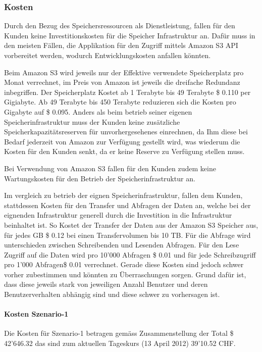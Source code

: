 \subsubsection{Kosten}
Durch den Bezug des Speichersressourcen als Dienstleistung, fallen für den Kunden keine Investitionskosten für die Speicher Infrastruktur an.
Dafür muss in den meisten Fällen, die Applikation für den Zugriff mittels Amazon S3 API vorbereitet werden, wodurch Entwicklungskosten anfallen könnten.

Beim Amazon S3 wird jeweils nur der Effektive verwendete Speicherplatz pro Monat verrechnet, im Preis von Amazon ist jeweils die dreifache Redundanz inbegriffen. Der Speicherplatz Kostet ab 1 Terabyte bis 49 Terabyte \$ 0.110 per Gigiabyte. Ab 49 Terabyte bis 450 Terabyte reduzieren sich die Kosten pro Gigabyte auf \$ 0.095. Anders als beim betrieb seiner eigenen Speicherinfrastruktur muss der Kunden keine zusätzliche Speicherkapazitätsreserven für unvorhergesehenes einrechnen, da Ihm diese bei Bedarf jederzeit von Amazon zur Verfügung gestellt wird, was wiederum die Kosten für den Kunden senkt, da er keine Reserve zu Verfügung stellen muss.

Bei Verwendung von Amazon S3 fallen für den Kunden zudem keine Wartungskosten für den Betrieb der Speicherinfrastruktur an. 

Im vergleich zu betrieb der eignen Speicherinfrastruktur, fallen dem Kunden, stattdessen Kosten für den Transfer und Abfragen der Daten an, welche bei der eignenden Infrastruktur generell durch die Investition in die Infrastruktur beinhaltet ist. So Kostet der Transfer der Daten aus der Amazon S3 Speicher aus, für jedes GB \$ 0.12 bei einen Transfervolumen bis 10 TB. Für die Abfrage wird unterschieden zwischen Schreibenden und Lesenden Abfragen. Für den Lese Zugriff auf die Daten wird pro 10'000 Abfragen \$ 0.01 und für jede Schreibzugriff pro 1'000 Abfragen\$ 0.01 verrechnet. Gerade diese Kosten sind jedoch schwer vorher zubestimmen und könnten zu Überraschungen sorgen. Grund dafür ist, dass diese jeweils stark von jeweiligen Anzahl Benutzer und deren Benutzerverhalten abhängig sind und diese schwer zu vorhersagen ist.

\paragraph*{Kosten Szenario-1}
Die Kosten für Szenario-1 betragen gemäss Zusammenstellung der Total \$ 42'646.32 das sind zum aktuellen Tageskurs (13 April 2012) 39'10.52 CHF. 


